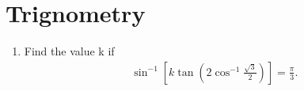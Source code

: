 \documentclass {article}
\begin{document}
\section {Trignometry}   
\begin {enumerate}

\item Find the value k if \\ 
	\begin {align}
	\sin^{-1} \left[k \tan \left( 2\cos^{-1} \frac {\sqrt{3}}{2}\right)\right]= \frac{\pi}{3}.
\end {align}
	\end {enumerate}
	
\end{document}
